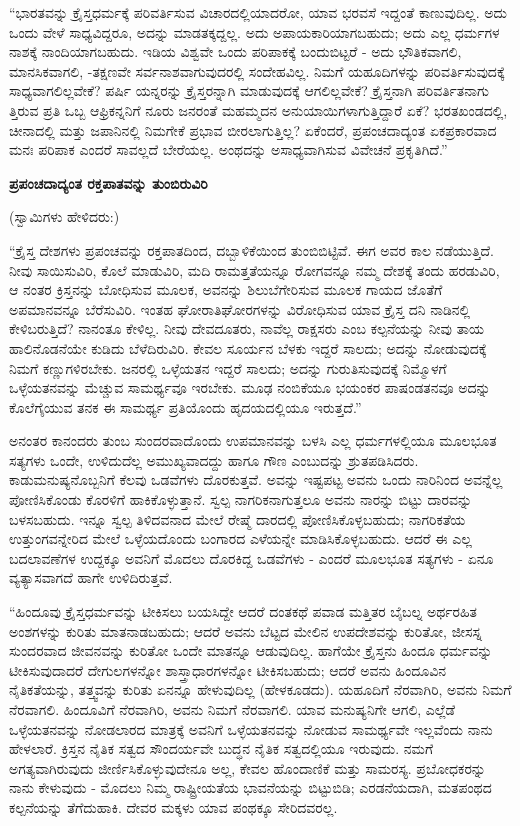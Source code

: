“ಭಾರತವನ್ನು ಕ್ರೈಸ್ತಧರ್ಮಕ್ಕೆ ಪರಿವರ್ತಿಸುವ ವಿಚಾರದಲ್ಲಿಯಾದರೋ, ಯಾವ ಭರವಸೆ ಇದ್ದಂತೆ ಕಾಣುವುದಿಲ್ಲ. ಅದು ಒಂದು ವೇಳೆ ಸಾಧ್ಯವಿದ್ದರೂ, ಅದನ್ನು ಮಾಡತಕ್ಕದ್ದಲ್ಲ. ಅದು ಅಪಾಯಕಾರಿಯಾಗಬಹುದು; ಅದು ಎಲ್ಲ ಧರ್ಮಗಳ ನಾಶಕ್ಕೆ ನಾಂದಿಯಾಗಬಹುದು. ಇಡಿಯ ವಿಶ್ವವೇ ಒಂದು ಪರಿಪಾಕಕ್ಕೆ ಬಂದುಬಿಟ್ಟರೆ - ಅದು ಭೌತಿಕವಾಗಲಿ, ಮಾನಸಿಕವಾಗಲಿ, -ತಕ್ಷಣವೇ ಸರ್ವನಾಶವಾಗುವುದರಲ್ಲಿ ಸಂದೇಹವಿಲ್ಲ. ನಿಮಗೆ ಯಹೂದಿಗಳನ್ನು ಪರಿವರ್ತಿಸುವುದಕ್ಕೆ ಸಾಧ್ಯವಾಗಲಿಲ್ಲವೇಕೆ? ಪರ್ಷಿ ಯನ್ನರನ್ನು ಕ್ರೈಸ್ತರನ್ನಾಗಿ ಮಾಡುವುದಕ್ಕೆ ಆಗಲಿಲ್ಲವೇಕೆ? ಕ್ರೈಸ್ತನಾಗಿ ಪರಿವರ್ತಿತನಾಗು ತ್ತಿರುವ ಪ್ರತಿ ಒಬ್ಬ ಆಫ್ರಿಕನ್ನನಿಗೆ ನೂರು ಜನರಂತೆ ಮಹಮ್ಮದನ ಅನುಯಾಯಿಗಳಾಗುತ್ತಿದ್ದಾರೆ ಏಕೆ? ಭರತಖಂಡದಲ್ಲಿ, ಚೀನಾದಲ್ಲಿ ಮತ್ತು ಜಪಾನಿನಲ್ಲಿ ನಿಮಗೇಕೆ ಪ್ರಭಾವ ಬೀರಲಾಗುತ್ತಿಲ್ಲ? ಏಕೆಂದರೆ, ಪ್ರಪಂಚದಾದ್ಯಂತ ಏಕಪ್ರಕಾರವಾದ ಮನಃ ಪರಿಪಾಕ ಎಂದರೆ ಸಾವಲ್ಲದೆ ಬೇರೆಯಲ್ಲ. ಅಂಥದನ್ನು ಅಸಾಧ್ಯವಾಗಿಸುವ ವಿವೇಚನೆ ಪ್ರಕೃತಿಗಿದೆ.”

\begin{center}
\textbf{ಪ್ರಪಂಚದಾದ್ಯಂತ ರಕ್ತಪಾತವನ್ನು ತುಂಬಿರುವಿರಿ}
\end{center}

(ಸ್ವಾಮಿಗಳು ಹೇಳಿದರು:)

“ಕ್ರೈಸ್ತ ದೇಶಗಳು ಪ್ರಪಂಚವನ್ನು ರಕ್ತಪಾತದಿಂದ, ದಬ್ಬಾಳಿಕೆಯಿಂದ ತುಂಬಿಬಿಟ್ಟಿವೆ. ಈಗ ಅವರ ಕಾಲ ನಡೆಯುತ್ತಿದೆ. ನೀವು ಸಾಯಿಸುವಿರಿ, ಕೊಲೆ ಮಾಡುವಿರಿ, ಮದಿ ರಾಮತ್ತತೆಯನ್ನೂ ರೋಗವನ್ನೂ ನಮ್ಮ ದೇಶಕ್ಕೆ ತಂದು ಹರಡುವಿರಿ, ಆ ನಂತರ ಕ್ರಿಸ್ತನನ್ನು ಬೋಧಿಸುವ ಮೂಲಕ, ಅವನನ್ನು ಶಿಲುಬೆಗೇರಿಸುವ ಮೂಲಕ ಗಾಯದ ಜೊತೆಗೆ ಅಪಮಾನವನ್ನೂ ಬೆರೆಸುವಿರಿ. ಇಂತಹ ಘೋರಾತಿಘೋರಗಳನ್ನು ವಿರೋಧಿಸುವ ಯಾವ ಕ್ರೈಸ್ತ ದನಿ ನಾಡಿನಲ್ಲಿ ಕೇಳಿಬರುತ್ತಿದೆ? ನಾನಂತೂ ಕೇಳಿಲ್ಲ. ನೀವು ದೇವದೂತರು, ನಾವೆಲ್ಲ ರಾಕ್ಷಸರು ಎಂಬ ಕಲ್ಪನೆಯನ್ನು ನೀವು ತಾಯ ಹಾಲಿನೊಡನೆಯೇ ಕುಡಿದು ಬೆಳೆದಿರುವಿರಿ. ಕೇವಲ ಸೂರ್ಯನ ಬೆಳಕು ಇದ್ದರೆ ಸಾಲದು; ಅದನ್ನು ನೋಡುವುದಕ್ಕೆ ನಿಮಗೆ ಕಣ್ಣುಗಳಿರಬೇಕು. ಜನರಲ್ಲಿ ಒಳ್ಳೆಯತನ ಇದ್ದರೆ ಸಾಲದು; ಅದನ್ನು ಗುರುತಿಸುವುದಕ್ಕೆ ನಿಮ್ಮೊಳಗೆ ಒಳ್ಳೆಯತನವನ್ನು ಮೆಚ್ಚುವ ಸಾಮರ್ಥ್ಯವೂ ಇರಬೇಕು. ಮೂಢ ನಂಬಿಕೆಯೂ ಭಯಂಕರ ಪಾಷಂಡತನವೂ ಅದನ್ನು ಕೊಲೆಗೈಯುವ ತನಕ ಈ ಸಾಮರ್ಥ್ಯ ಪ್ರತಿಯೊಂದು ಹೃದಯದಲ್ಲಿಯೂ ಇರುತ್ತದೆ.”

ಅನಂತರ ಕಾನಂದರು ತುಂಬ ಸುಂದರವಾದೊಂದು ಉಪಮಾನವನ್ನು ಬಳಸಿ ಎಲ್ಲ ಧರ್ಮಗಳಲ್ಲಿಯೂ ಮೂಲಭೂತ ಸತ್ಯಗಳು ಒಂದೇ, ಉಳಿದುದೆಲ್ಲ ಅಮುಖ್ಯವಾದದ್ದು ಹಾಗೂ ಗೌಣ ಎಂಬುದನ್ನು ಶ್ರುತಪಡಿಸಿದರು. ಕಾಡುಮನುಷ್ಯನೊಬ್ಬನಿಗೆ ಕೆಲವು ಒಡವೆಗಳು ದೊರಕುತ್ತವೆ. ಅವನ್ನು ಇಷ್ಟಪಟ್ಟ ಅವನು ಒಂದು ನಾರಿನಿಂದ ಅವನ್ನೆಲ್ಲ ಪೋಣಿಸಿಕೊಂಡು ಕೊರಳಿಗೆ ಹಾಕಿಕೊಳ್ಳುತ್ತಾನೆ. ಸ್ವಲ್ಪ ನಾಗರಿಕನಾಗುತ್ತಲೂ ಅವನು ನಾರನ್ನು ಬಿಟ್ಟು ದಾರವನ್ನು ಬಳಸಬಹುದು. ಇನ್ನೂ ಸ್ವಲ್ಪ ತಿಳಿದವನಾದ ಮೇಲೆ ರೇಷ್ಮೆ ದಾರದಲ್ಲಿ ಪೋಣಿಸಿಕೊಳ್ಳಬಹುದು; ನಾಗರಿಕತೆಯ ಉತ್ತುಂಗವನ್ನೇರಿದ ಮೇಲೆ ಒಳ್ಳೆಯದೊಂದು ಬಂಗಾರದ ಎಳೆಯನ್ನೇ ಮಾಡಿಸಿಕೊಳ್ಳಬಹುದು. ಆದರೆ ಈ ಎಲ್ಲ ಬದಲಾವಣೆಗಳ ಉದ್ದಕ್ಕೂ ಅವನಿಗೆ ಮೊದಲು ದೊರಕಿದ್ದ ಒಡವೆಗಳು - ಎಂದರೆ ಮೂಲಭೂತ ಸತ್ಯಗಳು - ಏನೂ ವ್ಯತ್ಯಾಸವಾಗದೆ ಹಾಗೇ ಉಳಿದಿರುತ್ತವೆ.

“ಹಿಂದೂವು ಕ್ರೈಸ್ತಧರ್ಮವನ್ನು ಟೀಕಿಸಲು ಬಯಸಿದ್ದೇ ಆದರೆ ದಂತಕಥೆ ಪವಾಡ ಮತ್ತಿತರ ಬೈಬಲ್ನ ಅರ್ಥರಹಿತ ಅಂಶಗಳನ್ನು ಕುರಿತು ಮಾತನಾಡಬಹುದು; ಆದರೆ ಅವನು ಬೆಟ್ಟದ ಮೇಲಿನ ಉಪದೇಶವನ್ನು ಕುರಿತೋ, ಜೀಸಸ್ನ ಸುಂದರವಾದ ಜೀವನವನ್ನು ಕುರಿತೋ ಒಂದೇ ಮಾತನ್ನೂ ಆಡುವುದಿಲ್ಲ. ಹಾಗೆಯೇ ಕ್ರೈಸ್ತನು ಹಿಂದೂ ಧರ್ಮವನ್ನು ಟೀಕಿಸುವುದಾದರೆ ದೇಗುಲಗಳನ್ನೋ ಶಾಸ್ತ್ರಾಧಾರಗಳನ್ನೋ ಟೀಕಿಸಬಹುದು; ಆದರೆ ಅವನು ಹಿಂದೂವಿನ ನೈತಿಕತೆಯನ್ನು, ತತ್ತ್ವವನ್ನು ಕುರಿತು ಏನನ್ನೂ ಹೇಳುವುದಿಲ್ಲ (ಹೇಳಕೂಡದು). ಯಹೂದಿಗೆ ನೆರವಾಗಿರಿ, ಅವನು ನಿಮಗೆ ನೆರವಾಗಲಿ. ಹಿಂದೂವಿಗೆ ನೆರವಾಗಿರಿ, ಅವನು ನಿಮಗೆ ನೆರವಾಗಲಿ. ಯಾವ ಮನುಷ್ಯನಿಗೇ ಆಗಲಿ, ಎಲ್ಲೆಡೆ ಒಳ್ಳೆಯತನವನ್ನು ನೋಡಲಾರದ ಮಾತ್ರಕ್ಕೆ ಅವನಿಗೆ ಒಳ್ಳೆಯತನವನ್ನು ನೋಡುವ ಸಾಮರ್ಥ್ಯವೇ ಇಲ್ಲವೆಂದು ನಾನು ಹೇಳಲಾರೆ. ಕ್ರಿಸ್ತನ ನೈತಿಕ ಸತ್ವದ ಸೌಂದರ್ಯವೇ ಬುದ್ಧನ ನೈತಿಕ ಸತ್ವದಲ್ಲಿಯೂ ಇರುವುದು. ನಮಗೆ ಅಗತ್ಯವಾಗಿರುವುದು ಜೀರ್ಣಿಸಿಕೊಳ್ಳುವುದೇನೂ ಅಲ್ಲ, ಕೇವಲ ಹೊಂದಾಣಿಕೆ ಮತ್ತು ಸಾಮರಸ್ಯ. ಪ್ರಬೋಧಕರನ್ನು ನಾನು ಕೇಳುವುದು - ಮೊದಲು ನಿಮ್ಮ ರಾಷ್ಟ್ರೀಯತೆಯ ಭಾವನೆಯನ್ನು ಬಿಟ್ಟುಬಿಡಿ; ಎರಡನೆಯದಾಗಿ, ಮತಪಂಥದ ಕಲ್ಪನೆಯನ್ನು ತೆಗೆದುಹಾಕಿ. ದೇವರ ಮಕ್ಕಳು ಯಾವ ಪಂಥಕ್ಕೂ ಸೇರಿದವರಲ್ಲ.


